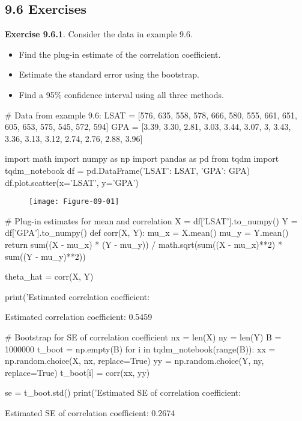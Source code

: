 \subsection*{9.6 Exercises}

\textbf{Exercise 9.6.1}. Consider the data in example 9.6.
\begin{itemize}[tightlist]
\item
  Find the plug-in estimate of the correlation coefficient.\\
\item
  Estimate the standard error using the bootstrap.\\
\item
  Find a 95\% confidence interval using all three methods.
\end{itemize}

\begin{python}
# Data from example 9.6:
LSAT = [576, 635, 558, 578, 666, 580, 555, 661, 651, 605, 653, 575, 545, 572, 594]
GPA = [3.39, 3.30, 2.81, 3.03, 3.44, 3.07, 3, 3.43, 3.36, 3.13, 3.12, 2.74, 2.76, 2.88, 3.96]
\end{python}

\begin{python}
import math
import numpy as np
import pandas as pd
from tqdm import tqdm_notebook
df = pd.DataFrame({'LSAT': LSAT, 'GPA': GPA})
df.plot.scatter(x='LSAT', y='GPA')
\end{python}

\begin{figure}[H]
\centering
\texttt{[image: Figure-09-01]}
\end{figure}


\begin{python}
# Plug-in estimates for mean and correlation
X = df['LSAT'].to_numpy()
Y = df['GPA'].to_numpy()
def corr(X, Y):
    mu_x = X.mean()
    mu_y = Y.mean()
    return sum((X - mu_x) * (Y - mu_y)) / math.sqrt(sum((X - mu_x)**2) * sum((Y - mu_y)**2))
  
theta_hat = corr(X, Y)
    
print('Estimated correlation coefficient: %
\end{python}
\begin{console}
Estimated correlation coefficient: 0.5459
\end{console}

\begin{python}
# Bootstrap for SE of correlation coefficient
nx = len(X)
ny = len(Y)
B = 1000000
t_boot = np.empty(B)
for i in tqdm_notebook(range(B)):
    xx = np.random.choice(X, nx, replace=True)
    yy = np.random.choice(Y, ny, replace=True)
    t_boot[i] = corr(xx, yy)
    
se = t_boot.std()
print('Estimated SE of correlation coefficient: %
\end{python}
\begin{console}
Estimated SE of correlation coefficient: 0.2674
\end{console}


